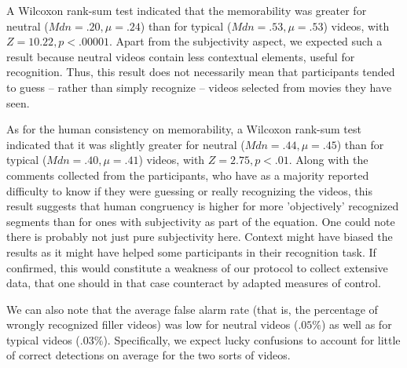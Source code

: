 \documentclass[sigconf]{acmart}
\begin{document}
A Wilcoxon rank-sum test indicated that the memorability was greater for neutral ($Mdn=.20, \mu=.24$) than for typical ($Mdn=.53, \mu=.53$) videos, with $Z=10.22, p<.00001$.
Apart from the subjectivity aspect, we expected such a result because neutral videos contain less contextual elements, useful for recognition.
Thus, this result does not necessarily mean that participants tended to guess -- rather than simply recognize -- videos selected from movies they have seen.

As for the human consistency on memorability, a Wilcoxon rank-sum test indicated that it was slightly greater for neutral ($Mdn=.44, \mu=.45$) than for typical ($Mdn=.40, \mu=.41$) videos, with $Z=2.75, p<.01$.
Along with the comments collected from the participants, who have as a majority reported difficulty to know if they were guessing or really recognizing the videos, this result suggests that human congruency is higher for more 'objectively' recognized segments than for ones with subjectivity as part of the equation. 
One could note there is probably not just pure subjectivity here.
Context might have biased the results as it might have helped some participants in their recognition task.
If confirmed, this would constitute a weakness of our protocol to collect extensive data, that one should in that case counteract by adapted measures of control.

We can also note that the average false alarm rate (that is, the percentage of wrongly recognized filler videos) was low for neutral videos ($.05\%$) as well as for typical videos ($.03\%$).
Specifically, we expect lucky confusions to account for little of correct detections on average for the two sorts of videos.

\end{document}
